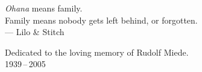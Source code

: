 \thispagestyle{empty}

\vspace*{3cm}


\begin{center}
\emph{Ohana} means family.\\
Family means nobody gets left behind, or forgotten.\\
\medskip{}
--- Lilo \& Stitch 
\par\end{center}

\medskip{}


\begin{center}
Dedicated to the loving memory of Rudolf Miede.\\
\smallskip{}
1939\,--\,2005 
\par\end{center}
